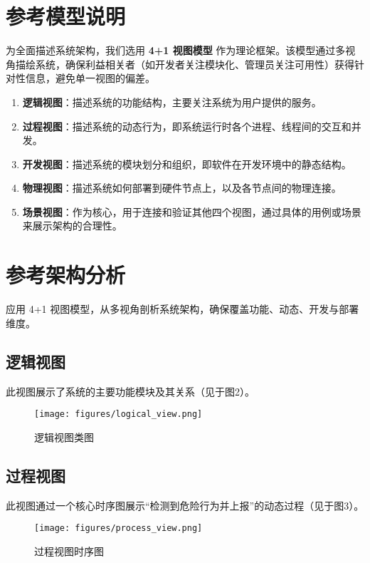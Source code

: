 \documentclass[a4paper,12pt]{article}
\begin{document}
\section{参考模型说明}
为全面描述系统架构，我们选用 \textbf{4+1 视图模型} 作为理论框架。该模型通过多视角描绘系统，确保利益相关者（如开发者关注模块化、管理员关注可用性）获得针对性信息，避免单一视图的偏差。
\begin{enumerate}
  \item \textbf{逻辑视图}：描述系统的功能结构，主要关注系统为用户提供的服务。
  \item \textbf{过程视图}：描述系统的动态行为，即系统运行时各个进程、线程间的交互和并发。
  \item \textbf{开发视图}：描述系统的模块划分和组织，即软件在开发环境中的静态结构。
  \item \textbf{物理视图}：描述系统如何部署到硬件节点上，以及各节点间的物理连接。
  \item \textbf{场景视图}：作为核心，用于连接和验证其他四个视图，通过具体的用例或场景来展示架构的合理性。
\end{enumerate}

\section{参考架构分析}
应用 4+1 视图模型，从多视角剖析系统架构，确保覆盖功能、动态、开发与部署维度。

\subsection{逻辑视图}
此视图展示了系统的主要功能模块及其关系（见于图2）。

\begin{figure}[h]
  \centering
  \texttt{[image: figures/logical\_view.png]}
  \caption{逻辑视图类图}
  \label{fig:logical_view}
\end{figure}

\subsection{过程视图}
此视图通过一个核心时序图展示“检测到危险行为并上报”的动态过程（见于图3）。

\begin{figure}[h]
  \centering
  \texttt{[image: figures/process\_view.png]}
  \caption{过程视图时序图}
  \label{fig:process_view}
\end{figure}
\end{document}

